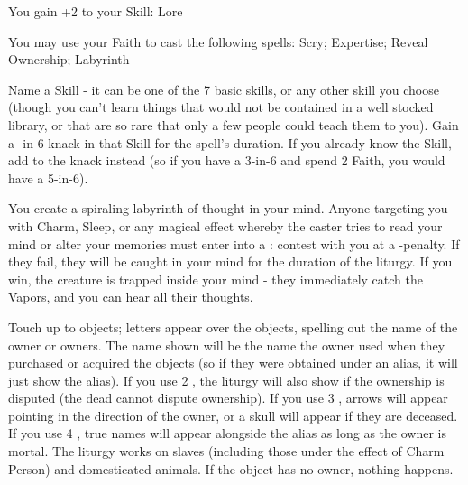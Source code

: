 {

You gain +2 to your Skill: Lore


You may use your Faith to cast the following spells: Scry; Expertise; Reveal Ownership; Labyrinth

\LITURGY [
  Name= Expertise,
  Link= thoth-liturgy-expertise,
  Paradigm= Mind ,
  Save=  N ,
  Duration= \SUMDICE Minutes ,
  Counter=  n/a  ,
  Keywords= None ,
  Target=   Self
]



Name a Skill - it can be one of the 7 basic skills, or any other skill you choose (though you can't learn things that would not be contained in a well stocked library, or that are so rare that only a few people could teach them to you).  Gain a \DICE-in-6 {knack} in that Skill for the spell's duration.  If you already know the Skill, add \DICE to the {knack} instead (so if you have a 3-in-6 and spend 2 Faith, you would have a 5-in-6).

\LITURGY [
  Name= Labyrinth,
  Link=thoth-liturgy-labyrinth,
  Paradigm= Mind ,
  Save=  N ,
  Duration= Combat or \SUMDICE Minutes ,
  Counter=  n/a  ,
  Keywords= None ,
  Target=   Self
]



You create a spiraling labyrinth of thought in your mind.  Anyone targeting you with Charm, Sleep, or any magical effect whereby the caster tries to read your mind or alter your memories must enter into a \RB : \FOC contest with you at a -\DICE penalty.  If they fail, they will be caught in your mind for the duration of the liturgy.  If you win, the creature is trapped inside your mind - they immediately catch the Vapors, and you can hear all their thoughts.

\LITURGY [
  Name= Reveal Ownership,
  Link=thoth-liturgy-reveal-ownership,
  Paradigm= Prophesy ,
  Save=  N ,
  Duration= \SUMDICE Minutes ,
  Counter=  n/a  ,
  Keywords= Splittable ,
  Target=   Close objects
]



Touch up to \DICE objects; letters appear over the objects, spelling out the name of the owner or owners.  The name shown will be the name the owner used when they purchased or acquired the objects (so if they were obtained under an alias, it will just show the alias). 
If you use 2 \DICE, the liturgy will also show if the ownership is disputed (the dead cannot dispute ownership).  If you use 3 \DICE, arrows will appear pointing in the direction of the owner, or a skull will appear if they are deceased.  If you use 4 \DICE, true names will appear alongside the alias as long as the owner is mortal.
The liturgy works on slaves (including those under the effect of Charm Person) and domesticated animals.  If the object has no owner, nothing happens.

}
